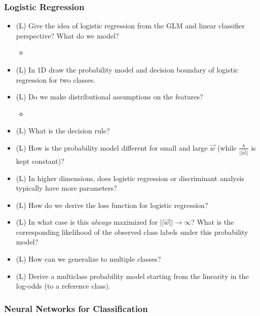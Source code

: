 \subsubsection*{Logistic Regression}
\begin{itemize}
    \item (L) Give the idea of logistic regression from the GLM and linear classifier perspective? What do we model?
    \begin{itemize}
        \item {}
    \end{itemize}
    \item (L) In 1D draw the probability model and decision boundary of logistic regression for two classes.
    \item (L) Do we make distributional assumptions on the features?
    \begin{itemize}
        \item {}
    \end{itemize}
    \item (L) What is the decision rule?
    \item (L) How is the probability model different for small and large $\vec{w}$ (while $\frac{b}{||\vec{w}||}$ is kept constant)?
    \item (L) In higher dimensions, does logistic regression or discriminant analysis typically have more parameters?
    \item (L) How do we derive the loss function for logistic regression?
    \item (L) In what case is this \textit{always} maximized for $||\vec{w}|| \rightarrow \infty$? What is the corresponding likelihood of the observed class labels under this probability model?
    \item (L) How can we generalize to multiple classes?
    \item (L) Derive a multiclass probability model starting from the linearity in the log-odds (to a reference class).
\end{itemize}

\subsubsection*{Neural Networks for Classification}

